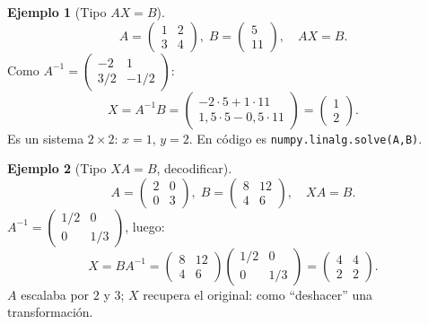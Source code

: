 \documentclass[a4paper,12pt]{article}
\theoremstyle{definition}
\newtheorem{ejemplo}{Ejemplo}[section]
\begin{document}
\begin{ejemplo}[Tipo $AX=B$]
\[
A=\begin{pmatrix} 1 & 2 \\ 3 & 4 \end{pmatrix}, \; B=\begin{pmatrix} 5 \\ 11 \end{pmatrix}, \quad AX=B.
\]
Como $A^{-1}=\begin{pmatrix} -2 & 1 \\ 3/2 & -1/2 \end{pmatrix}$:
\[
X=A^{-1}B=\begin{pmatrix} -2\cdot5+1\cdot11 \\ 1{,}5\cdot5-0{,}5\cdot11 \end{pmatrix}=\begin{pmatrix} 1 \\ 2 \end{pmatrix}.
\]
Es un sistema $2 \times 2$: $x=1$, $y=2$. En código es \texttt{numpy.linalg.solve(A,B)}.
\end{ejemplo}

\begin{ejemplo}[Tipo $XA=B$, decodificar]
\[
A=\begin{pmatrix} 2 & 0 \\ 0 & 3 \end{pmatrix}, \; B=\begin{pmatrix} 8 & 12 \\ 4 & 6 \end{pmatrix}, \quad XA=B.
\]
$A^{-1}=\begin{pmatrix} 1/2 & 0 \\ 0 & 1/3 \end{pmatrix}$, luego:
\[
X=BA^{-1}=\begin{pmatrix} 8 & 12 \\ 4 & 6 \end{pmatrix}\begin{pmatrix} 1/2 & 0 \\ 0 & 1/3 \end{pmatrix}=\begin{pmatrix} 4 & 4 \\ 2 & 2 \end{pmatrix}.
\]
$A$ escalaba por $2$ y $3$; $X$ recupera el original: como ``deshacer'' una transformación.
\end{ejemplo}
\end{document}
